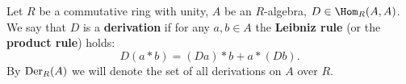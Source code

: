 \begin{definition}
  Let
    $R$ be a commutative ring with unity,
    $A$ be an $R$-algebra,
    $D \in \Hom_R(A, A)$.
  We say that $D$ is a \textbf{derivation} if for any $a, b \in A$ the
  \textbf{Leibniz rule} (or the \textbf{product rule}) holds:
  \begin{equation}
    D(a * b) = (D a) * b + a * (D b).
  \end{equation}
  By ${\rm Der}_R(A)$ we will denote the set of all derivations on $A$ over $R$.
\end{definition}
